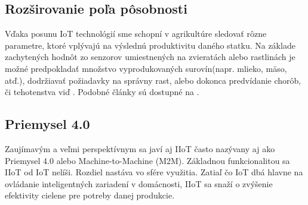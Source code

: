 \documentclass[a4paper, 11pt]{article}
\begin{document}
\subsection{Rozširovanie poľa pôsobnosti}
Vďaka posunu IoT technológií sme schopní v agrikultúre sledovať rôzne parametre, ktoré vplývajú na výslednú produktivitu daného statku. Na základe zachytených hodnôt zo senzorov umiestnených na zvieratách alebo rastlinách je možné predpokladať množstvo vyprodukovaných surovín(napr. mlieko, mäso, atď.), dodržiavať požiadavky na správny rast, alebo dokonca predvídanie chorôb, či tehotenstva viď \cite{Agro}. Podobné články sú dostupné na \cite{IEEE}.

\subsection{Priemysel 4.0}
Zaujímavým a veľmi perspektívnym sa javí aj IIoT\cite{IIoT} často nazývany aj ako Priemysel 4.0 alebo Machine-to-Machine (M2M). Základnou funkcionalitou sa IIoT od IoT nelíši. Rozdiel nastáva vo sfére využitia. Zatiaľ čo IoT dbá hlavne na ovládanie inteligentných zariadení v domácnosti, IIoT sa snaží o zvýšenie efektivity cielene pre potreby danej produkcie.\cite{Lewandowski2019}


\newpage

\renewcommand{\refname}{Literatúra}

\end{document}
